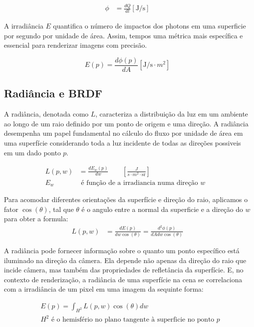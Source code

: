 \documentclass[english, 
               brazil, 
               bsc] %
               {dcomp-abntex2}
\begin{document}
\begin{align*} 
  \phi &= \frac{dQ}{dt} [\text{J/s}] 
\end{align*}

A irradiância $E$ quantifica o número de impactos dos photons em uma superficie por segundo por unidade de área. Assim, tempos uma métrica mais específica e essencial para renderizar imagens com precisão.

$$
 E(p) = \frac{d\phi(p)}{dA} [\text{J/s} \cdot m^2]
$$


\subsection{Radiância e BRDF} \label{brdf}

A radiância, denotada como $L$, caracteriza a distribuição da luz em um ambiente ao longo de um raio definido por um ponto de origem e uma direção. A radiância desempenha um papel fundamental no cálculo do fluxo por unidade de área em uma superfície considerando toda a luz incidente de todas as direções possiveis em um dado ponto $p$.


\begin{align*} 
  L(p,w) &= \frac{dE_w(p)}{dw} \qquad \left[\frac{J}{s\cdot m^2\cdot \text{sr}}\right]\\ 
E_w &\text{ é função de a irradiancia numa direção $w$ }  \end{align*}


Para acomodar diferentes orientações da superfície e direção do raio, aplicamos o fator $\cos(\theta)$, tal que $\theta$ é o angulo entre a normal da superficie e a direção do $w$ para obter a formula:
\begin{align*} 
  L(p,w) &= \frac{dE(p)}{dw \cos(\theta)} = \frac{d^2\phi(p)}{dAdw \cos(\theta)}
\end{align*}

A radiância pode fornecer informação sobre o quanto um ponto específico está iluminado na direção da câmera. Ela depende não apenas da direção do raio que incide câmera, mas também das propriedades de refletância da superfície. E, no contexto de renderização, a radiância de uma superfície na cena se correlaciona com a irradiância de um pixel em uma imagem da sequinte forma: 

\begin{align*}
  &E(p) = \int_{H^2}{L(p,w)\cos(\theta)dw}\\
  &H^2 \text{ é o hemisfério no plano tangente à superficie no ponto $p$}
\end{align*}
\end{document}
